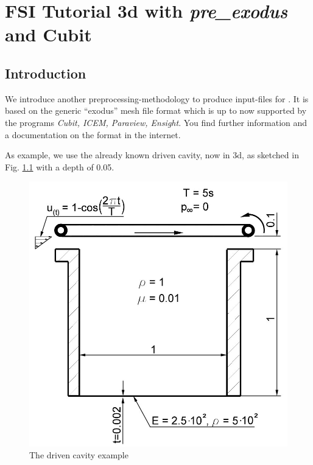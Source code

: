 \newcommand{\prexo}{\emph{pre\_exodus \,}}
\newcommand{\bc}{\emph{bc-file \,}}
\newcommand{\head}{\emph{header-file \,}}

\chapter{FSI Tutorial 3d with \prexo and Cubit}
\label{tut_fsi_preexo:chap}

\section{Introduction}

We introduce another preprocessing-methodology to produce input-files for
\baci{}. It is based on the generic ``exodus'' mesh file format which is
up to now supported by the programs \textit{Cubit, ICEM, Paraview, Ensight}.
You find further information and a documentation on the format in the internet.

As example, we use the already known driven cavity, now in 3d, as
sketched in Fig. \ref{tut_fsi_preexo:1.1} with a depth of 0.05.

\begin{figure}[h]
\hfil\includegraphics[scale=0.2]{Bilder/Angabeskizze}

\caption{\label{tut_fsi_preexo:1.1} The driven cavity example}
\end{figure}

